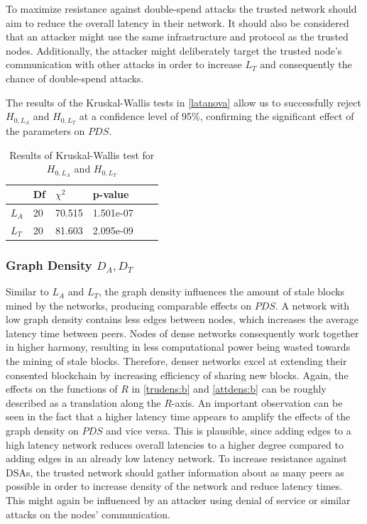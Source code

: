 \documentclass[a4paper,12pt,twoside]{report}
\begin{document}
To maximize resistance against double-spend attacks the trusted network should aim to reduce the overall latency in their network. It should also be considered that an attacker might use the same infrastructure and protocol as the trusted nodes. Additionally, the attacker might deliberately target the trusted node's communication with other attacks in order to increase $L_{T}$ and consequently the chance of double-spend attacks.

The results of the Kruskal-Wallis tests in \autoref{latanova} allow us to successfully reject $H_{0,L_A}$ and $H_{0,L_T}$ at a confidence level of 95\%, confirming the significant effect of the parameters on $PDS$.
\begin{table}[hb]
\centering
\begin{tabular}{|l|l|l|l|l|l|} \hline
& Df & $\chi^{2}$ & p-value \\ \hline
$L_A$ & 20 &  70.515 & 1.501e-07 \\ \hline
$L_T$ & 20 &  81.603 & 2.095e-09 \\ \hline
\end{tabular}
\caption{Results of Kruskal-Wallis test for $H_{0,L_A}$ and $H_{0,L_T}$}
\label{latanova}
\end{table}

\subsubsection{Graph Density $D_{A},D_T$}
Similar to $L_{A}$ and $L_{T}$, the graph density influences the amount of stale blocks mined by the networks, producing comparable effects on $PDS$. A network with low graph density contains less edges between nodes, which increases the average latency time between peers. Nodes of dense networks consequently work together in higher harmony, resulting in less computational power being wasted towards the mining of stale blocks. Therefore, denser networks excel at extending their consented blockchain by increasing efficiency of sharing new blocks. Again, the effects on the functions of $R$ in \autoref{trudens:b} and \autoref{attdens:b} can be roughly described as a translation along the $R$-axis. An important observation can be seen in the fact that a higher latency time appears to amplify the effects of the graph density on $PDS$ and vice versa. This is plausible, since adding edges to a high latency network reduces overall latencies to a higher degree compared to adding edges in an already low latency network. To increase resistance against DSAs, the trusted network should gather information about as many peers as possible in order to increase density of the network and reduce latency times. This might again be influenced by an attacker using denial of service or similar attacks on the nodes' communication.
\end{document}
